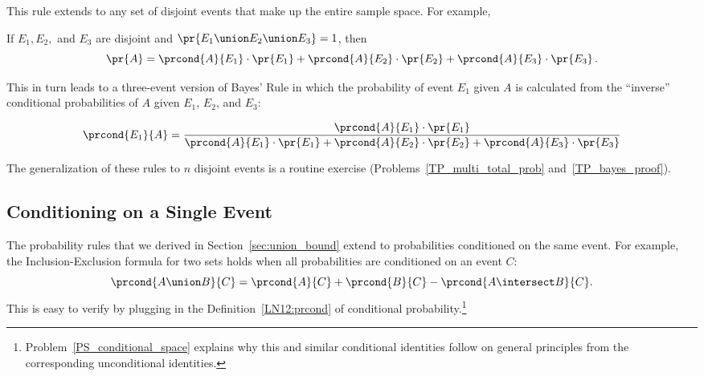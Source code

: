 This rule extends to any set of disjoint events that make up the
entire sample space.  For example,
\begin{rul*}
If $E_1, E_2,$ and $E_3$ are disjoint and
$\pr{E_1 \union E_2 \union E_3} = 1$, then
\[
\pr{A} = \prcond{A}{E_1} \cdot \pr{E_1} + \prcond{A}{E_2} \cdot
\pr{E_2} + \prcond{A}{E_3} \cdot \pr{E_3}\,.
\]
\end{rul*}
This in turn leads to a three-event version of Bayes' Rule in which
the probability of event $E_1$ given $A$ is calculated from the
``inverse'' conditional probabilities of $A$ given $E_1$, $E_2$, and
$E_3$:

\begin{rul*}
\[
\prcond{E_1}{A} = \frac{\prcond{A}{E_1}\cdot \pr{E_1}}
                       {\prcond{A}{E_1} \cdot \pr{E_1} +
                        \prcond{A}{E_2} \cdot \pr{E_2} +
                        \prcond{A}{E_3} \cdot \pr{E_3}}
\]
\end{rul*}

The generalization of these rules to $n$ disjoint events is a routine
exercise (Problems~\ref{TP_multi_total_prob} and~\ref{TP_bayes_proof}).


\subsection{Conditioning on a Single Event}\label{cond_ident_subsec}

The probability rules that we derived in Section~\ref{sec:union_bound}
extend to probabilities conditioned on the same event.  For example,
the Inclusion-Exclusion formula for two sets holds when all
probabilities are conditioned on an event $C$:
\[
\prcond{A \union B}{C} = \prcond{A}{C} + \prcond{B}{C} - \prcond{A \intersect B}{C}.
\]
This is easy to verify by plugging in the Definition~\ref{LN12:prcond}
of conditional 
probability.\footnote{Problem~\ref{PS_conditional_space} explains why
  this and similar conditional identities follow on general principles
  from the corresponding unconditional identities.}

\iffalse
Namely,
\begin{align*}
\prcond{A \union B}{C}
    &= \frac{\pr{(A \union B) \intersect C}}{\pr{C}} \\[3pt]
    &= \frac{\pr{(A \intersect C) \union (B \intersect C)}}{\pr{C}} \\[3pt]
    &= \frac{\pr{A \intersect C} + \pr{B \intersect C}
             - \pr{A \intersect B \intersect C}}
            {\pr{C}} \\[3pt]
    &= \prcond{A}{C} + \prcond{B}{C} - \prcond{A \intersect B}{C}.
\end{align*}
\fi

